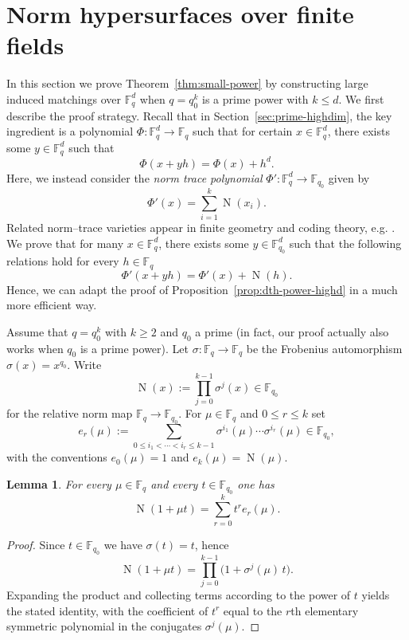 \documentclass[12pt,reqno]{amsart}
\theoremstyle{plain}
\newtheorem{lemma}[theorem]{Lemma}
\theoremstyle{definition}
\newcommand{\F}{\mathbb{F}}
\newcommand{\1}{\mathbf{1}}
\DeclareMathOperator{\Norm}{N}
\begin{document}
\section{Norm hypersurfaces over finite fields}
\label{sec:matching-highpower-II}

In this section we prove Theorem~\ref{thm:small-power} by constructing large induced matchings over $\F_q^d$ when $q = q_0^k$ is a prime power with $k \leq d$. We first describe the proof strategy. Recall that in Section~\ref{sec:prime-highdim}, the key ingredient is a polynomial $\Phi: \F_q^d \to \F_q$ such that for certain $x \in \F_q^d$, there exists some $y \in \F_q^d$ such that
$$\Phi(x + y h) = \Phi(x) + h^d.$$
Here, we instead consider the \emph{norm trace polynomial} $\Phi': \F_q^d \to \F_{q_0}$ given by
$$\Phi'(x) = \sum_{i = 1}^k \Norm(x_i).$$
Related norm--trace varieties appear in finite geometry and coding theory, e.g. \cite{Geil2003NormTrace}. We prove that for many $x \in \F_q^d$, there exists some $y \in \F_{q_0}^d$ such that the following relations hold for every $h \in \F_q$
$$\Phi'(x + y h) = \Phi'(x) + \Norm(h).$$
Hence, we can adapt the proof of Proposition~\ref{prop:dth-power-highd} in a much more efficient way.

\smallskip

Assume that $q=q_0^k$ with $k\ge 2$ and $q_0$ a prime (in fact, our proof actually also works when $q_0$ is a prime power).
Let $\sigma:\F_q\to\F_q$ be the Frobenius automorphism $\sigma(x)=x^{q_0}$.
Write
\[
  \Norm(x):=\prod_{j=0}^{k-1}\sigma^j(x)\in\F_{q_0}
\]
for the relative norm map $\F_q\to\F_{q_0}$.
For $\mu\in\F_q$ and $0\le r\le k$ set
\[
  e_r(\mu):=\sum_{0\le i_1<\cdots<i_r\le k-1}\sigma^{i_1}(\mu)\cdots\sigma^{i_r}(\mu)\in \F_{q_0},
\]
with the conventions $e_0(\mu)=1$ and $e_k(\mu)=\Norm(\mu)$.

\begin{lemma}\label{lem:norm-expansion-k}
For every $\mu\in\F_q$ and every $t\in\F_{q_0}$ one has
\[
  \Norm(1+\mu t)=\sum_{r=0}^k t^r e_r(\mu).
\]
\end{lemma}

\begin{proof}
Since $t\in\F_{q_0}$ we have $\sigma(t)=t$, hence
\[
  \Norm(1+\mu t)=\prod_{j=0}^{k-1}\bigl(1+\sigma^j(\mu)\,t\bigr).
\]
Expanding the product and collecting terms according to the power of $t$ yields the stated identity,
with the coefficient of $t^r$ equal to the $r$th elementary symmetric polynomial in the conjugates $\sigma^j(\mu)$.
\end{proof}
\end{document}
